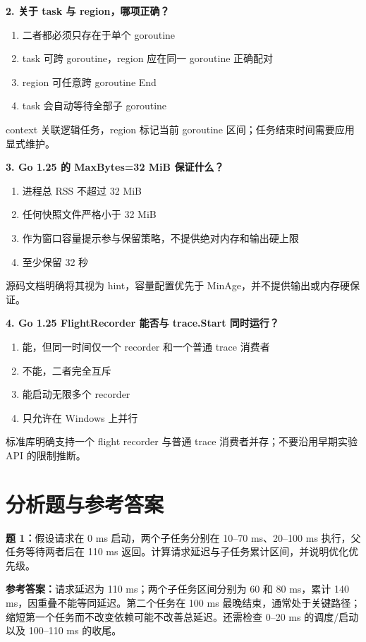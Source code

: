 \documentclass[UTF8,fontset=fandol,openany,11pt]{ctexbook}
\begin{document}
\noindent\textbf{2. 关于 task 与 region，哪项正确？}
\begin{enumerate}[label=\Alph*.]
\item 二者都必须只存在于单个 goroutine
\item task 可跨 goroutine，region 应在同一 goroutine 正确配对
\item region 可任意跨 goroutine End
\item task 会自动等待全部子 goroutine
\end{enumerate}
context 关联逻辑任务，region 标记当前 goroutine 区间；任务结束时间需要应用显式维护。

\noindent\textbf{3. Go 1.25 的 MaxBytes=32 MiB 保证什么？}
\begin{enumerate}[label=\Alph*.]
\item 进程总 RSS 不超过 32 MiB
\item 任何快照文件严格小于 32 MiB
\item 作为窗口容量提示参与保留策略，不提供绝对内存和输出硬上限
\item 至少保留 32 秒
\end{enumerate}
源码文档明确将其视为 hint，容量配置优先于 MinAge，并不提供输出或内存硬保证。

\noindent\textbf{4. Go 1.25 FlightRecorder 能否与 trace.Start 同时运行？}
\begin{enumerate}[label=\Alph*.]
\item 能，但同一时间仅一个 recorder 和一个普通 trace 消费者
\item 不能，二者完全互斥
\item 能启动无限多个 recorder
\item 只允许在 Windows 上并行
\end{enumerate}
标准库明确支持一个 flight recorder 与普通 trace 消费者并存；不要沿用早期实验 API 的限制推断。

\section{分析题与参考答案}
\noindent\textbf{题 1：}假设请求在 0 ms 启动，两个子任务分别在 10–70 ms、20–100 ms 执行，父任务等待两者后在 110 ms 返回。计算请求延迟与子任务累计区间，并说明优化优先级。

\noindent\textbf{参考答案：}请求延迟为 110 ms；两个子任务区间分别为 60 和 80 ms，累计 140 ms，因重叠不能等同延迟。第二个任务在 100 ms 最晚结束，通常处于关键路径；缩短第一个任务而不改变依赖可能不改善总延迟。还需检查 0–20 ms 的调度/启动以及 100–110 ms 的收尾。
\end{document}
